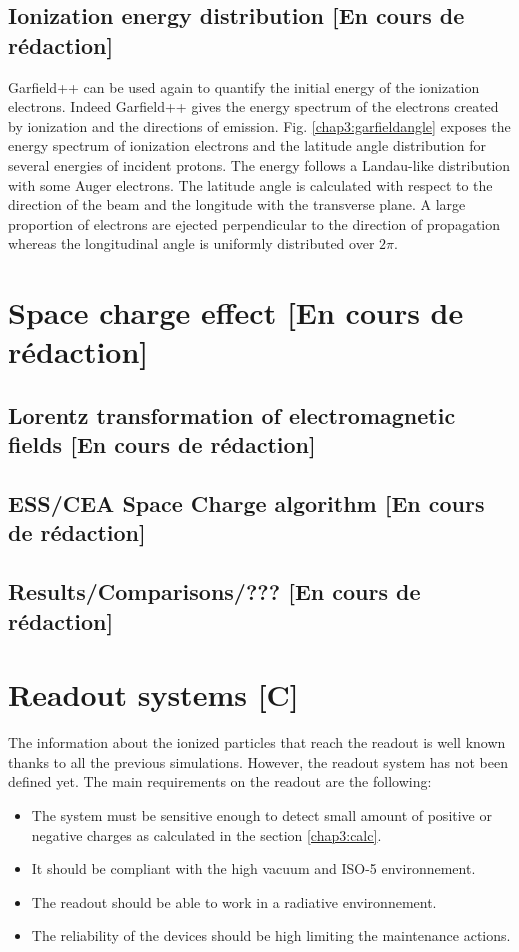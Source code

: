 \begin{refsection}
  \subsection{Ionization energy distribution [En cours de rédaction]}
  Garfield++ can be used again to quantify the initial energy of the ionization electrons. Indeed Garfield++ gives the energy spectrum of the electrons created by ionization and the directions of emission. Fig. \ref{chap3:garfieldangle} exposes the energy spectrum of ionization electrons and the latitude angle distribution for several energies of incident protons. The energy follows a Landau-like distribution with some Auger electrons. The latitude angle is calculated with respect to the direction of the beam and the longitude with the transverse plane. A large proportion of electrons are ejected perpendicular to the direction of propagation whereas the longitudinal angle is uniformly distributed over $2 \pi$.
  
  

  \section{Space charge effect [En cours de rédaction]}
  \subsection{Lorentz transformation of electromagnetic fields [En cours de rédaction]}
  \subsection{ESS/CEA Space Charge algorithm [En cours de rédaction]}
  \subsection{Results/Comparisons/??? [En cours de rédaction]}
  \section{Readout systems [C]}
  The information about the ionized particles that reach the readout is well known thanks to all the previous simulations. However, the readout system has not been defined yet. The main requirements on the readout are the following:
  \begin{itemize}
    \item The system must be sensitive enough to detect small amount of positive or negative charges as calculated in the section \ref{chap3:calc}.
    \item It should be compliant with the high vacuum and ISO-5 environnement.
    \item The readout should be able to work in a radiative environnement. 
    \item The reliability of the devices should be high limiting the maintenance actions. 
  \end{itemize}


\end{refsection}
